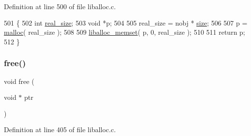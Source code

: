 Definition at line 500 of file liballoc.\+c.


\begin{DoxyCode}
501 \{
502        \textcolor{keywordtype}{int} \hyperlink{a00126_ad22b1c69bdce419783ac165f7f354245_ad22b1c69bdce419783ac165f7f354245}{real\_size};
503        \textcolor{keywordtype}{void} *p;
504 
505        real\_size = nobj * \hyperlink{a00126_a29b056a39f6022d32468e7913e6df936_a29b056a39f6022d32468e7913e6df936}{size};
506        
507        p = \hyperlink{a00035_a7ac38fce3243a7dcf448301ee9ffd392_a7ac38fce3243a7dcf448301ee9ffd392}{malloc}( real\_size );
508 
509        \hyperlink{a00035_ad824e94da51543e1febb05f96f0083ba_ad824e94da51543e1febb05f96f0083ba}{liballoc\_memset}( p, 0, real\_size );
510 
511        \textcolor{keywordflow}{return} p;
512 \}
\end{DoxyCode}
\mbox{\label{a00035_afbedc913aa4651b3c3b4b3aecd9b4711_afbedc913aa4651b3c3b4b3aecd9b4711}} 
\subsubsection{\texorpdfstring{free()}{free()}}
{\footnotesize\ttfamily void free (\begin{DoxyParamCaption}\item[{void $\ast$}]{ptr }\end{DoxyParamCaption})}



Definition at line 405 of file liballoc.\+c.


